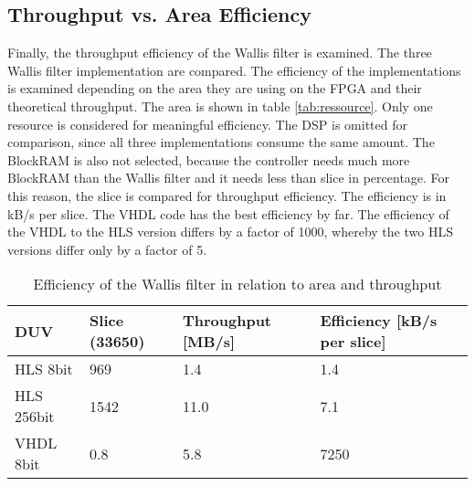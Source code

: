 \subsection{Throughput vs. Area Efficiency}
Finally, the throughput efficiency of the Wallis filter is examined. The three
Wallis filter implementation are compared. The efficiency of the
implementations is examined depending on the area they are using on the FPGA
and their theoretical throughput. The area is shown in table 
\ref{tab:ressource}. Only one resource is considered for meaningful efficiency.
The DSP is omitted for comparison, since all three implementations consume the
same amount. The BlockRAM is also not selected, because the controller needs
much more BlockRAM than the Wallis filter and it needs less than slice in percentage. For this reason, the slice is compared for throughput efficiency. The efficiency is in kB/s per slice. The VHDL code has the best efficiency by far. The efficiency of the VHDL to the HLS version differs by a factor of 1000, whereby the two HLS versions differ only by a factor of 5.

\begin{table}[tb!]
    \centering
    \begin{tabular}{l l l l}
        \toprule
        DUV         & Slice (33650) & Throughput [MB/s] & Efficiency [kB/s per
        slice]\\
        \midrule
        HLS  8bit    &  969          & 1.4               & 1.4   \\
        HLS  256bit  &  1542         & 11.0              & 7.1   \\
        VHDL 8bit        &  0.8          & 5.8               & 7250  \\
        \bottomrule
    \end{tabular}
    \caption{Efficiency of the Wallis filter in relation to area and throughput}
    \label{tab:efficiency}
\end{table}






